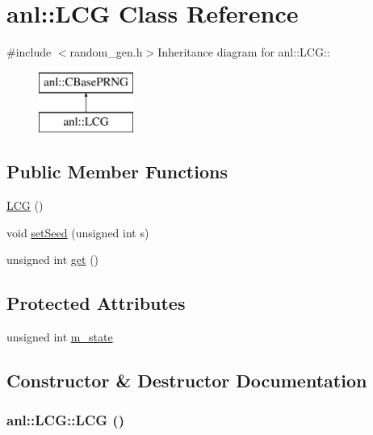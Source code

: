 \hypertarget{classanl_1_1LCG}{
\section{anl::LCG Class Reference}
\label{classanl_1_1LCG}
}


{\ttfamily \#include $<$random\_\-gen.h$>$}Inheritance diagram for anl::LCG::\begin{figure}[H]
\begin{center}
\leavevmode
\includegraphics[height=2cm]{classanl_1_1LCG}
\end{center}
\end{figure}
\subsection*{Public Member Functions}
\begin{DoxyCompactItemize}
\item 
\hyperlink{classanl_1_1LCG_a9e2d4885fcd82e6b77752c21867815f3}{LCG} ()
\item 
void \hyperlink{classanl_1_1LCG_a671261ff641cf73b5929b3ab0d19fe37}{setSeed} (unsigned int s)
\item 
unsigned int \hyperlink{classanl_1_1LCG_a65cb6d076966f0a22afb66ef633166bf}{get} ()
\end{DoxyCompactItemize}
\subsection*{Protected Attributes}
\begin{DoxyCompactItemize}
\item 
unsigned int \hyperlink{classanl_1_1LCG_a580ef65a1521702a11bf195ef9474a6e}{m\_\-state}
\end{DoxyCompactItemize}


\subsection{Constructor \& Destructor Documentation}
\hypertarget{classanl_1_1LCG_a9e2d4885fcd82e6b77752c21867815f3}{
\subsubsection[{LCG}]{\setlength{\rightskip}{0pt plus 5cm}anl::LCG::LCG ()}}
\label{classanl_1_1LCG_a9e2d4885fcd82e6b77752c21867815f3}


